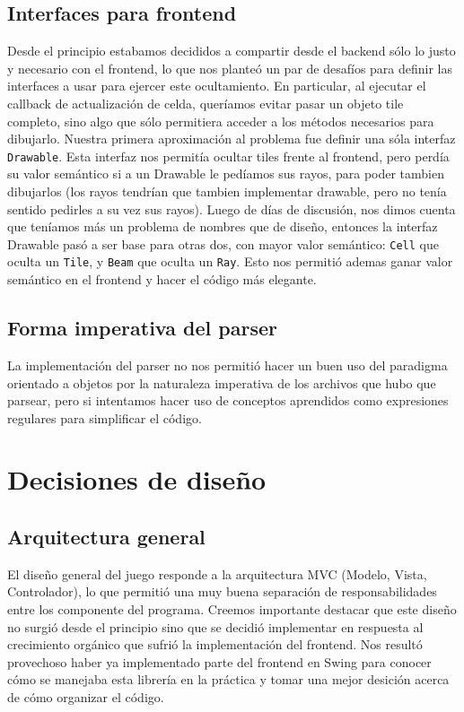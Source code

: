 \documentclass[a4paper, 11pt]{article}
\begin{document}
	\subsection{Interfaces para frontend}
	Desde el principio estabamos decididos a compartir desde el backend sólo lo justo y necesario con el frontend, lo que nos planteó un par de desafíos para definir las interfaces a usar para ejercer este ocultamiento. En particular, al ejecutar el callback de actualización de celda, queríamos evitar pasar un objeto tile completo, sino algo que sólo permitiera acceder a los métodos necesarios para dibujarlo. Nuestra primera aproximación al problema fue definir una sóla interfaz \texttt{Drawable}. Esta interfaz nos permitía ocultar tiles frente al frontend, pero perdía su valor semántico si a un Drawable le pedíamos sus rayos, para poder tambien dibujarlos (los rayos tendrían que tambien implementar drawable, pero no tenía sentido pedirles a su vez sus rayos). Luego de días de discusión, nos dimos cuenta que teníamos más un problema de nombres que de diseño, entonces la interfaz Drawable pasó a ser base para otras dos, con mayor valor semántico: \texttt{Cell} que oculta un \texttt{Tile}, y \texttt{Beam} que oculta un \texttt{Ray}. Esto nos permitió ademas ganar valor semántico en el frontend y hacer el código más elegante.

	\subsection{Forma imperativa del parser}
	La implementación del parser no nos permitió hacer un buen uso del paradigma orientado a objetos por la naturaleza imperativa de los archivos que hubo que parsear, pero si intentamos hacer uso de conceptos aprendidos como expresiones regulares para simplificar el código.

\section{Decisiones de diseño} 

	\subsection{Arquitectura general}
	El diseño general del juego responde a la arquitectura MVC (Modelo, Vista, Controlador), lo que permitió una muy buena separación de responsabilidades entre los componente del programa. Creemos importante destacar que este diseño no surgió desde el principio sino que se decidió implementar en respuesta al crecimiento orgánico que sufrió la implementación del frontend. Nos resultó provechoso haber ya implementado parte del frontend en Swing para conocer cómo se manejaba esta librería en la práctica y tomar una mejor desición acerca de cómo organizar el código.
\end{document}
